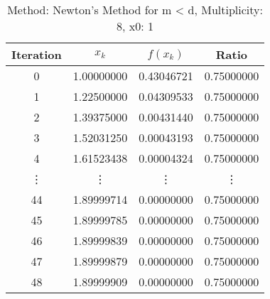 \begin{table}
\centering
\caption{Method: Newton's Method for m < d, Multiplicity: 8, x0: 1}
\label{tab:table_Newton's_Method_for_m_<_d_8_1}
\begin{tabular}{c c c c}
\toprule
Iteration &      $x_k$ &   $f(x_k)$ &      Ratio \\
\midrule
        0 & 1.00000000 & 0.43046721 & 0.75000000 \\
        1 & 1.22500000 & 0.04309533 & 0.75000000 \\
        2 & 1.39375000 & 0.00431440 & 0.75000000 \\
        3 & 1.52031250 & 0.00043193 & 0.75000000 \\
        4 & 1.61523438 & 0.00004324 & 0.75000000 \\
   \vdots &     \vdots &     \vdots &     \vdots \\
       44 & 1.89999714 & 0.00000000 & 0.75000000 \\
       45 & 1.89999785 & 0.00000000 & 0.75000000 \\
       46 & 1.89999839 & 0.00000000 & 0.75000000 \\
       47 & 1.89999879 & 0.00000000 & 0.75000000 \\
       48 & 1.89999909 & 0.00000000 & 0.75000000 \\
\bottomrule
\end{tabular}
\end{table}
